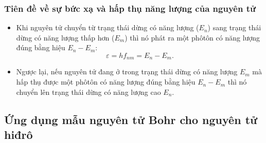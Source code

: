 \subsubsection{Tiên đề về sự bức xạ và hấp thụ năng lượng của nguyên tử}
\begin{itemize}
	\item Khi nguyên tử chuyển từ trạng thái dừng có năng lượng ($E_ n$) sang trạng thái dừng có năng lượng thấp hơn ($E_m$) thì nó phát ra một phôtôn có năng lượng đúng bằng hiệu $E_n-E_m$:
	\begin{equation}
		\varepsilon = h f_{nm}=E_n-E_m.
	\end{equation}
	\item Ngược lại, nếu nguyên tử đang ở trong trạng thái dừng có năng lượng $E_m$ mà hấp thụ được một phôtôn có năng lượng đúng bằng hiệu $E_n-E_m$ thì nó chuyển lên trạng thái dừng có năng lượng cao $E_n$.
\end{itemize}
\subsection{Ứng dụng mẫu nguyên tử Bohr cho nguyên tử hiđrô}
